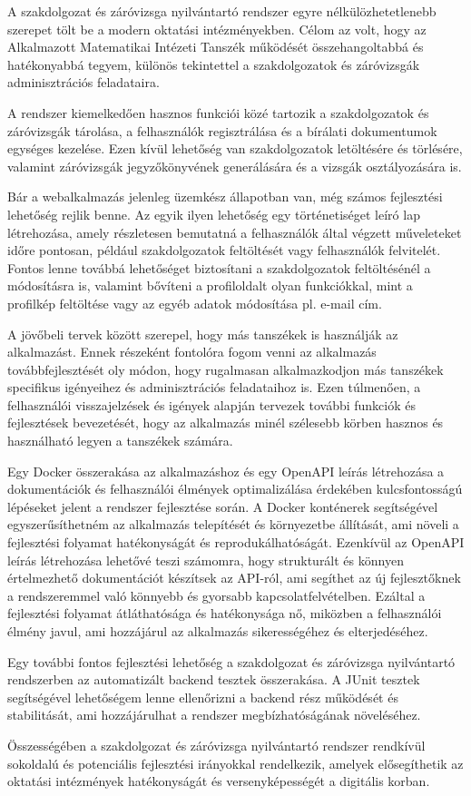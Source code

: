 

A szakdolgozat és záróvizsga nyilvántartó rendszer egyre nélkülözhetetlenebb szerepet tölt be a modern oktatási intézményekben. Célom az volt, hogy az Alkalmazott Matematikai Intézeti Tanszék működését összehangoltabbá és hatékonyabbá tegyem, különös tekintettel a szakdolgozatok és záróvizsgák adminisztrációs feladataira.

A rendszer kiemelkedően hasznos funkciói közé tartozik a szakdolgozatok és záróvizsgák tárolása, a felhasználók regisztrálása és a bírálati dokumentumok egységes kezelése. Ezen kívül lehetőség van szakdolgozatok letöltésére és törlésére, valamint záróvizsgák jegyzőkönyvének generálására és a vizsgák osztályozására is.

Bár a webalkalmazás jelenleg üzemkész állapotban van, még számos fejlesztési lehetőség rejlik benne. Az egyik ilyen lehetőség egy történetiséget leíró lap létrehozása, amely részletesen bemutatná a felhasználók által végzett műveleteket időre pontosan, például szakdolgozatok feltöltését vagy felhasználók felvitelét. Fontos lenne továbbá lehetőséget biztosítani a szakdolgozatok feltöltésénél a módosításra is, valamint bővíteni a profiloldalt olyan funkciókkal, mint a profilkép feltöltése vagy az egyéb adatok módosítása pl. e-mail cím.

A jövőbeli tervek között szerepel, hogy más tanszékek is használják az alkalmazást. Ennek részeként fontolóra fogom venni az alkalmazás továbbfejlesztését oly módon, hogy rugalmasan alkalmazkodjon más tanszékek specifikus igényeihez és adminisztrációs feladataihoz is. Ezen túlmenően, a felhasználói visszajelzések és igények alapján tervezek további funkciók és fejlesztések bevezetését, hogy az alkalmazás minél szélesebb körben hasznos és használható legyen a tanszékek számára. 

Egy Docker összerakása az alkalmazáshoz és egy OpenAPI leírás létrehozása a dokumentációk és felhasználói élmények optimalizálása érdekében kulcsfontosságú lépéseket jelent a rendszer fejlesztése során. A Docker konténerek segítségével egyszerűsíthetném az alkalmazás telepítését és környezetbe állítását, ami növeli a fejlesztési folyamat hatékonyságát és reprodukálhatóságát. Ezenkívül az OpenAPI leírás létrehozása lehetővé teszi számomra, hogy strukturált és könnyen értelmezhető dokumentációt készítsek az API-ról, ami segíthet az új fejlesztőknek a rendszeremmel való könnyebb és gyorsabb kapcsolatfelvételben. Ezáltal a fejlesztési folyamat átláthatósága és hatékonysága nő, miközben a felhasználói élmény javul, ami hozzájárul az alkalmazás sikerességéhez és elterjedéséhez.

Egy további fontos fejlesztési lehetőség a szakdolgozat és záróvizsga nyilvántartó rendszerben az automatizált backend tesztek összerakása. A JUnit tesztek segítségével lehetőségem lenne ellenőrizni a backend rész működését és stabilitását, ami hozzájárulhat a rendszer megbízhatóságának növeléséhez. 

Összességében a szakdolgozat és záróvizsga nyilvántartó rendszer rendkívül sokoldalú és potenciális fejlesztési irányokkal rendelkezik, amelyek elősegíthetik az oktatási intézmények hatékonyságát és versenyképességét a digitális korban.